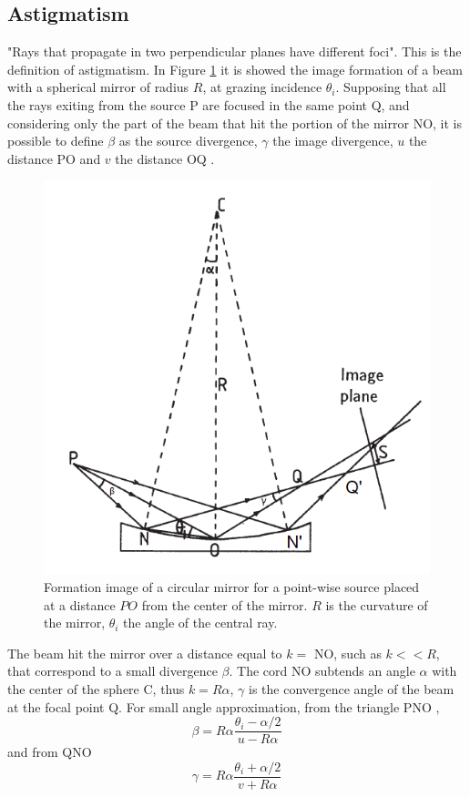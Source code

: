 \subsection{Astigmatism}
"Rays that propagate in two perpendicular planes have different foci". This is the definition of astigmatism. In Figure \ref{fig: System1} it is showed the image formation of a beam with a spherical mirror of radius $R $, at grazing incidence $\theta_i $. Supposing that all the rays exiting from the source P are focused in the same point Q, and considering only the part of the beam that hit the portion of the mirror NO, it is possible to define $\beta $ as the source divergence, $\gamma $ the image divergence, $u $ the distance PO and $v $ the distance OQ .
\begin{figure}[]
%
\centering
%
\includegraphics[width=.6\textwidth]{Immagini/Chapter2/System1}
%
\caption{Formation image of a circular mirror for a point-wise source placed at a distance $PO $ from the center of the mirror. $R $ is the curvature of the mirror, $\theta_i $ the angle of the central ray.}
%
\label{fig: System1}
%
\end{figure}
\noindent The beam hit the mirror over a distance equal to $k = $ NO, such as $k<<R $, that correspond to a small divergence $\beta $. The cord NO subtends an angle $\alpha $ with the center of the sphere C, thus $k = R \alpha $, $\gamma $ is the convergence angle of the beam at the focal point Q. For small angle approximation, from the triangle PNO ,
\begin{equation}
\beta = R \alpha \frac{\theta_i - \alpha / 2}{u - R \alpha}
\label{eq: beta}
\end{equation}
\noindent and from QNO
\begin{equation}
\gamma = R \alpha \frac{\theta_i + \alpha / 2}{v + R \alpha}
\label{eq: gamme}
\end{equation}
